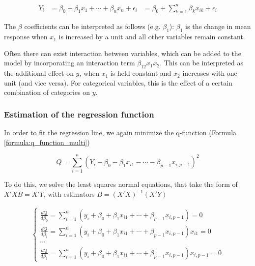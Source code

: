 \begin{equation}
    \begin{aligned}
        Y_i &= \beta_0 + \beta_1 x_1 + \cdots + \beta_n x_n + \epsilon_i
            &= \beta_0 + \sum_{k=1}^n \beta_k x_{ik} + \epsilon_i
    \end{aligned}
    \label{formula:multiple_linear_regression}
\end{equation}

The $\beta$ coefficients can be interpreted as follows (e.g. $\beta_1$): $\beta_1$ is the change in mean response when $x_1$ is increased by a unit and all other variables remain constant.

Often there can exist interaction between variables, which can be added to the model by incorporating an interaction term $\beta_{12} x_1 x_2$. This can be interpreted as the additional effect on $y$, when $x_1$ is held constant and $x_2$ increases with one unit (and vice versa). For categorical variables, this is the effect of a certain combination of categories on $y$.

\subsubsection{Estimation of the regression function}
In order to fit the regression line, we again minimize the q-function (Formula \ref{formula:q_function_multi})

\begin{equation}
    Q = \sum_{i=1}^n \left(Y_i - \beta_0 - \beta_1x_{i1} - \cdots - \beta_{p-1}x_{i, p-1}\right)^2
    \label{formula:q_function_multi}
\end{equation}

To do this, we solve the least squares normal equations, that take the form of $X'XB = X'Y$, with estimators $B = (X'X)^{-1} (X'Y)$

\begin{equation}
    \begin{aligned}
    \left\{
    \begin{aligned}
        \frac{dQ}{d\beta_0} = \sum_{i=1}^{n} (y_i + \beta_0 + \beta_1 x_{i1} + \cdots + \beta_{p-1} x_{i, p-1}) = 0 \\
        \frac{dQ}{d\beta_1} = \sum_{i=1}^{n} (y_i + \beta_0 + \beta_1 x_{i1} + \cdots + \beta_{p-1} x_{i, p-1})x_{i1} = 0 \\
        \cdots\\
        \frac{dQ}{d\beta_1} = \sum_{i=1}^{n} (y_i + \beta_0 + \beta_1 x_{i1} + \cdots + \beta_{p-1} x_{i, p-1})x_{i, p-1} = 0
    \end{aligned}
    \right.
    \end{aligned}
\end{equation}

